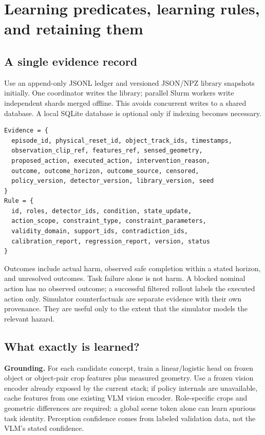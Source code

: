 \documentclass[10pt]{article}
\begin{document}
\section{Learning predicates, learning rules, and retaining them}
\subsection{A single evidence record}
Use an append-only JSONL ledger and versioned JSON/NPZ library snapshots initially. One coordinator writes the library; parallel Slurm workers write independent shards merged offline. This avoids concurrent writes to a shared database. A local SQLite database is optional only if indexing becomes necessary.

\begin{lstlisting}
Evidence = {
  episode_id, physical_reset_id, object_track_ids, timestamps,
  observation_clip_ref, features_ref, sensed_geometry,
  proposed_action, executed_action, intervention_reason,
  outcome, outcome_horizon, outcome_source, censored,
  policy_version, detector_version, library_version, seed
}
Rule = {
  id, roles, detector_ids, condition, state_update,
  action_scope, constraint_type, constraint_parameters,
  validity_domain, support_ids, contradiction_ids,
  calibration_report, regression_report, version, status
}
\end{lstlisting}

Outcomes include actual harm, observed safe completion within a stated horizon, and unresolved outcomes. Task failure alone is not harm. A blocked nominal action has no observed outcome; a successful filtered rollout labels the executed action only. Simulator counterfactuals are separate evidence with their own provenance. They are useful only to the extent that the simulator models the relevant hazard.

\subsection{What exactly is learned?}
\textbf{Grounding.} For each candidate concept, train a linear/logistic head on frozen object or object-pair crop features plus measured geometry. Use a frozen vision encoder already exposed by the current stack; if policy internals are unavailable, cache features from one existing VLM vision encoder. Role-specific crops and geometric differences are required: a global scene token alone can learn spurious task identity. Perception confidence comes from labeled validation data, not the VLM's stated confidence.
\end{document}
